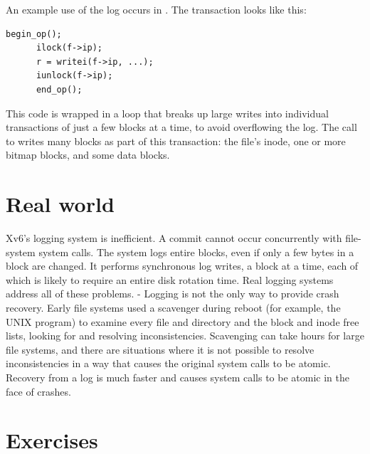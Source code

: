 An example use of the log occurs in 
.
The transaction looks like this:
\begin{lstlisting}[]
      begin_op();
      ilock(f->ip);
      r = writei(f->ip, ...);
      iunlock(f->ip);
      end_op();
\end{lstlisting}
This code is wrapped in a loop that breaks up large writes into individual
transactions of just a few blocks at a time, to avoid overflowing
the log.  The call to
writes many blocks as part of this
transaction: the file's inode, one or more bitmap blocks, and some data
blocks.

\section{Real world}

Xv6's logging system is inefficient.
A commit cannot occur concurrently with file-system system calls.
The system logs entire blocks, even if
only a few bytes in a block are changed. It performs synchronous
log writes, a block at a time, each of which is likely to require an
entire disk rotation time. Real logging systems address all of these
problems.
-
Logging is not the only way to provide crash recovery. Early file systems
used a scavenger during reboot (for example, the UNIX
program) to examine every file and directory and the block and inode
free lists, looking for and resolving inconsistencies. Scavenging can take
hours for large file systems, and there are situations where it is not
possible to resolve inconsistencies in a way that causes the original
system calls to be atomic. Recovery
from a log is much faster and causes system calls to be atomic
in the face of crashes.


\section{Exercises}

